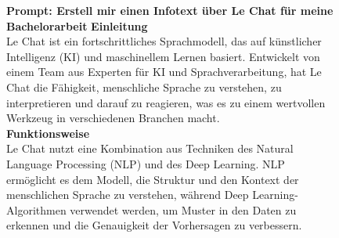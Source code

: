 \begin{figure} 
    \begin{tcolorbox}[colback=gray!20, colframe=gray!20, boxrule=0pt, sharp corners] 
        \textbf{Prompt: Erstell mir einen Infotext über Le Chat für meine Bachelorarbeit}
        \textbf{Einleitung}\\
        Le Chat ist ein fortschrittliches Sprachmodell, das auf künstlicher Intelligenz (KI) und maschinellem Lernen 
        basiert. Entwickelt von einem Team aus Experten für KI und Sprachverarbeitung, hat Le Chat die Fähigkeit, 
        menschliche Sprache zu verstehen, zu interpretieren und darauf zu reagieren, was es zu einem wertvollen 
        Werkzeug in verschiedenen Branchen macht.\\

        \textbf{Funktionsweise}\\
        Le Chat nutzt eine Kombination aus Techniken des Natural Language Processing (NLP) und des Deep Learning. NLP 
        ermöglicht es dem Modell, die Struktur und den Kontext der menschlichen Sprache zu verstehen, während Deep 
        Learning-Algorithmen verwendet werden, um Muster in den Daten zu erkennen und die Genauigkeit der Vorhersagen 
        zu verbessern.\\


\end{tcolorbox}
\end{figure}
